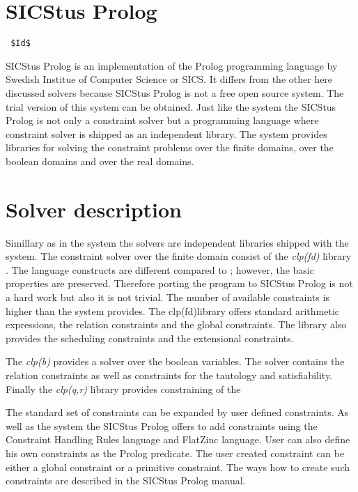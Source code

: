 \section{SICStus Prolog}
\verb= $Id$ =

SICStus Prolog is an implementation of the Prolog programming language by Swedish
Institue of Computer Science or SICS. It differs from the other here discussed solvers 
because SICStus Prolog is not a free open source system. The trial version of this
system can be obtained. Just like the \eclipse system the SICStus Prolog is not only
a constraint solver but a programming language where constraint solver is shipped as 
an independent library. The system provides libraries for solving the constraint problems
over the finite domains, over the boolean domains and over the real domains.

\section{Solver description}
Simillary as in the \eclipse system the solvers are independent libraries shipped 
with the system. The constraint solver over the finite domain consist of the
{\em clp(fd)} library \cite{Carlsson97anopen-ended}. The language constructs are different
compared to \eclipse; however, the basic properties are preserved. Therefore porting
the \eclipse program to SICStus Prolog is not a hard work but also it is not trivial.
The number of available constraints is higher than the \eclipse system provides.
The clp(fd)library offers standard arithmetic expressions, the relation constraints
and the global constraints. The library also provides the scheduling constraints and 
the extensional constraints.

The {\em clp(b)} provides a solver over the boolean variables. The solver contains
the relation constraints as well as constraints for the tautology and satisfiability.
Finally the {\em clp(q,r)} library \cite{clpqr:opai} provides constraining of the

The standard set of constraints can be expanded by user defined constraints. As well as the
\eclipse system the SICStus Prolog offers to add constraints using the Constraint Handling
Rules language and FlatZinc language. User can also define his own constraints as the
Prolog predicate. The user created constraint can be either a global constraint or
a primitive constraint. The ways how to create such constraints are described in 
the SICStus Prolog manual.


